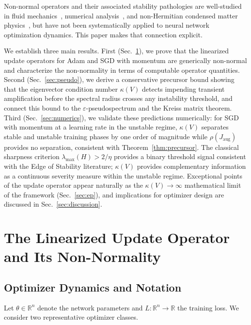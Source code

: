 \documentclass[aps,prresearch,twocolumn,superscriptaddress,longbibliography]{revtex4-2}
\newcommand{\R}{\mathbb{R}}
\begin{document}
Non-normal operators and their associated stability pathologies are
well-studied in fluid mechanics~\cite{trefethen1993},
numerical analysis~\cite{trefethen2005}, and non-Hermitian condensed
matter physics~\cite{ashida2020}, but have not been systematically
applied to neural network optimization dynamics.
This paper makes that connection explicit.

We establish three main results.
First (Sec.~\ref{sec:operator}), we prove that the linearized update
operators for Adam and SGD with momentum are generically non-normal and
characterize the non-normality in terms of computable operator
quantities.
Second (Sec.~\ref{sec:pseudo}), we derive a conservative precursor bound
showing that the eigenvector condition number $\kappa(V)$ detects
impending transient amplification before the spectral radius crosses any
instability threshold, and connect this bound to the $\varepsilon$-pseudospectrum
and the Kreiss matrix theorem.
Third (Sec.~\ref{sec:numerics}), we validate these predictions
numerically: for SGD with momentum at a learning rate in the unstable
regime, $\kappa(V)$ separates stable and unstable training phases by
one order of magnitude while $\rho(J_\mathrm{aug})$ provides no
separation, consistent with Theorem~\ref{thm:precursor}.
The classical sharpness criterion $\lambda_{\max}(H) > 2/\eta$
provides a binary threshold signal consistent with the Edge of Stability
literature; $\kappa(V)$ provides complementary information as a
continuous severity measure within the unstable regime.
Exceptional points of the update operator appear naturally as the
$\kappa(V)\to\infty$ mathematical limit of the framework
(Sec.~\ref{sec:ep}), and implications for optimizer design are discussed
in Sec.~\ref{sec:discussion}.

\section{The Linearized Update Operator and Its Non-Normality}
\label{sec:operator}

\subsection{Optimizer Dynamics and Notation}

Let $\theta \in \R^n$ denote the network parameters and
$L:\R^n\to\R$ the training loss.
We consider two representative optimizer classes.
\end{document}
